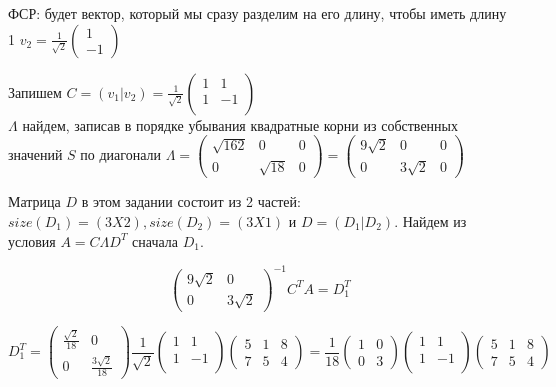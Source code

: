 \documentclass[a4paper,12pt]{article}
\newcounter{z}
\begin{document}
\begin{enumerate}
ФСР: будет вектор, который мы сразу разделим на его длину, чтобы иметь длину 1 $v_2 = \frac{1}{\sqrt{2}}\begin{pmatrix}
1\\
-1
\end{pmatrix}$


Запишем $C = (v_1|v_2)=\frac{1}{\sqrt{2}}\begin{pmatrix}
1&1\\
1&-1\\
\end{pmatrix}$\\
$\Lambda$ найдем, записав в порядке убывания квадратные корни из собственных значений $S$ по диагонали $\Lambda=\begin{pmatrix}
\sqrt{162}&0&0\\
0&\sqrt{18}&0
\end{pmatrix}=\begin{pmatrix}
9\sqrt{2}&0&0\\
0&3\sqrt{2}&0
\end{pmatrix}$

Матрица $D$ в этом задании состоит из 2 частей: $size(D_1)=(3X2), size(D_2)=(3X1)$ и $D = (D_1|D_2)$.
Найдем из условия $A = C \Lambda D^T$ сначала $D_1$.

$${\begin{pmatrix}
9\sqrt{2}&0\\
0&3\sqrt{2}
\end{pmatrix}}^{-1} C^T A = D_1^T$$

$$D_1^T={\begin{pmatrix}
\frac{\sqrt{2}}{18}&0\\
0&\frac{3\sqrt{2}}{18}
\end{pmatrix}} \frac{1}{\sqrt{2}}\begin{pmatrix}
1&1\\
1&-1\\
\end{pmatrix} \begin{pmatrix}
{5}&{1}&{8}\\
{7}&{5}&{4}
\end{pmatrix} = \frac{1}{18}{\begin{pmatrix}
1&0\\
0&3
\end{pmatrix}} \begin{pmatrix}
1&1\\
1&-1\\
\end{pmatrix} \begin{pmatrix}
{5}&{1}&{8}\\
{7}&{5}&{4}
\end{pmatrix}  $$


\end{enumerate}
\end{document}
